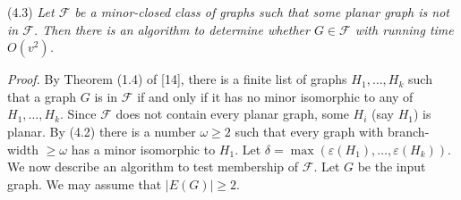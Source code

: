 \stmt
(4.3) \textit{Let $\mathcal{F}$ be a minor-closed class of graphs such that some planar graph is not in $\mathcal{F}$. Then there is an algorithm to determine whether $G \in \mathcal{F}$ with running time $O(v^2)$.}

\textit{Proof.} By Theorem (1.4) of [14], there is a finite list of graphs $H_1, \dots, H_k$ such that a graph $G$ is in $\mathcal{F}$ if and only if it has no minor isomorphic to any of $H_1, \dots, H_k$. Since $\mathcal{F}$ does not contain every planar graph, some $H_i$ (say $H_1$) is planar. By (4.2) there is a number $\omega \ge 2$ such that every graph with branch-width $\ge \omega$ has a minor isomorphic to $H_1$. Let $\delta = \max(\varepsilon(H_1), \dots, \varepsilon(H_k))$. We now describe an algorithm to test membership of $\mathcal{F}$. Let $G$ be the input graph. We may assume that $|E(G)| \ge 2$.
